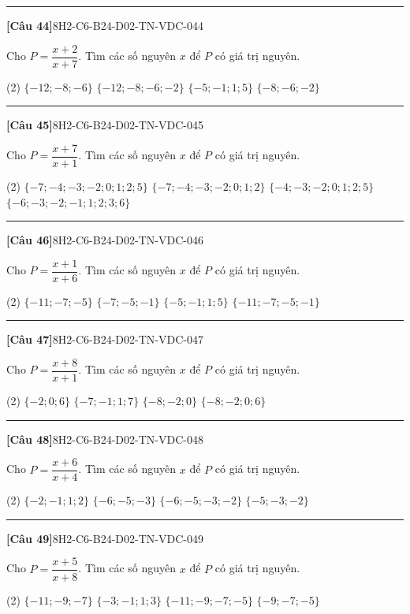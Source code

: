 \documentclass[12pt,a4paper]{article}
\newif\ifloigiai
\newenvironment{cauhoi}[2]{%
  \par\medskip\noindent\rule{\textwidth}{0.4pt}\par\nopagebreak
  \noindent\textbf{[#1]}\hfill{\scriptsize\ttfamily #2}\par\nopagebreak\smallskip}{\par}
\newcommand{\dapan}[1]{\ifloigiai\par\smallskip\noindent\textit{Đáp án:} \textbf{#1}\par\fi}
\begin{document}
\begin{cauhoi}{Câu 44}{8H2-C6-B24-D02-TN-VDC-044}
Cho $P=\dfrac{x+2}{x+7}$. Tìm các số nguyên $x$ để $P$ có giá trị nguyên.
\begin{tasks}(2)
\task $\{-12; -8; -6\}$
\task $\{-12; -8; -6; -2\}$
\task $\{-5; -1; 1; 5\}$
\task $\{-8; -6; -2\}$
\end{tasks}
\dapan{B}
\end{cauhoi}
\begin{cauhoi}{Câu 45}{8H2-C6-B24-D02-TN-VDC-045}
Cho $P=\dfrac{x+7}{x+1}$. Tìm các số nguyên $x$ để $P$ có giá trị nguyên.
\begin{tasks}(2)
\task $\{-7; -4; -3; -2; 0; 1; 2; 5\}$
\task $\{-7; -4; -3; -2; 0; 1; 2\}$
\task $\{-4; -3; -2; 0; 1; 2; 5\}$
\task $\{-6; -3; -2; -1; 1; 2; 3; 6\}$
\end{tasks}
\dapan{A}
\end{cauhoi}
\begin{cauhoi}{Câu 46}{8H2-C6-B24-D02-TN-VDC-046}
Cho $P=\dfrac{x+1}{x+6}$. Tìm các số nguyên $x$ để $P$ có giá trị nguyên.
\begin{tasks}(2)
\task $\{-11; -7; -5\}$
\task $\{-7; -5; -1\}$
\task $\{-5; -1; 1; 5\}$
\task $\{-11; -7; -5; -1\}$
\end{tasks}
\dapan{D}
\end{cauhoi}
\begin{cauhoi}{Câu 47}{8H2-C6-B24-D02-TN-VDC-047}
Cho $P=\dfrac{x+8}{x+1}$. Tìm các số nguyên $x$ để $P$ có giá trị nguyên.
\begin{tasks}(2)
\task $\{-2; 0; 6\}$
\task $\{-7; -1; 1; 7\}$
\task $\{-8; -2; 0\}$
\task $\{-8; -2; 0; 6\}$
\end{tasks}
\dapan{D}
\end{cauhoi}
\begin{cauhoi}{Câu 48}{8H2-C6-B24-D02-TN-VDC-048}
Cho $P=\dfrac{x+6}{x+4}$. Tìm các số nguyên $x$ để $P$ có giá trị nguyên.
\begin{tasks}(2)
\task $\{-2; -1; 1; 2\}$
\task $\{-6; -5; -3\}$
\task $\{-6; -5; -3; -2\}$
\task $\{-5; -3; -2\}$
\end{tasks}
\dapan{C}
\end{cauhoi}
\begin{cauhoi}{Câu 49}{8H2-C6-B24-D02-TN-VDC-049}
Cho $P=\dfrac{x+5}{x+8}$. Tìm các số nguyên $x$ để $P$ có giá trị nguyên.
\begin{tasks}(2)
\task $\{-11; -9; -7\}$
\task $\{-3; -1; 1; 3\}$
\task $\{-11; -9; -7; -5\}$
\task $\{-9; -7; -5\}$
\end{tasks}
\dapan{C}
\end{cauhoi}
\end{document}
